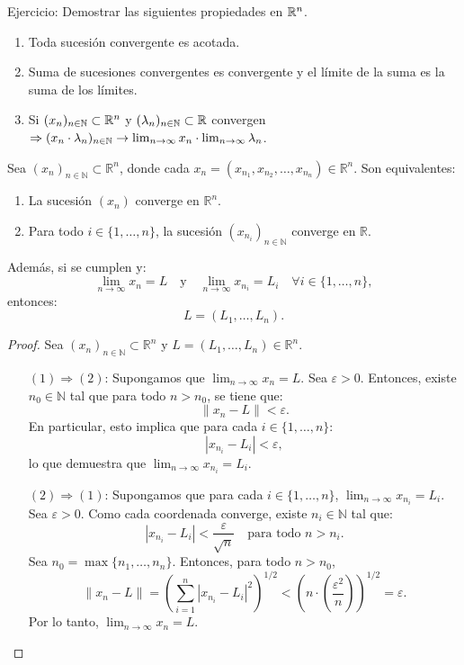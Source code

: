 \begin{prop}
  Ejercicio: Demostrar las siguientes propiedades en $\mathbb{R}^n$.
  \begin{enumerate}
    \item Toda sucesión convergente es acotada.
    \item Suma de sucesiones convergentes es convergente y el límite de la suma es la suma de los límites.
    \item Si $(x_n)_{n \in \mathbb{N}} \subset \mathbb{R}^n$ y $(\lambda_n)_{n \in \mathbb{N}} \subset \mathbb{R}$ convergen $\Rightarrow (x_n \cdot \lambda_n)_{n \in \mathbb{N}} \to \lim_{n \to \infty} x_n \cdot \lim_{n \to \infty} \lambda_n$.
  \end{enumerate}
\end{prop}

\begin{prop}
  Sea $(x_n)_{n \in \mathbb{N}} \subset \mathbb{R}^n$, donde cada $x_n = (x_{n_1}, x_{n_2}, \ldots, x_{n_n}) \in \mathbb{R}^n$. Son equivalentes:
  \begin{enumerate}
    \item La sucesión $(x_n)$ converge en $\mathbb{R}^n$.
    \item Para todo $i \in \{1, \ldots, n\}$, la sucesión $(x_{n_i})_{n \in \mathbb{N}}$ converge en $\mathbb{R}$.
  \end{enumerate}
  Además, si se cumplen y:
  \[
    \lim_{n \to \infty} x_n = L \quad \text{y} \quad \lim_{n \to \infty} x_{n_i} = L_i \quad \forall i \in \{1, \ldots, n\},
  \]
  entonces:
  \[
    L = (L_1, \ldots, L_n).
  \]
  \begin{proof}
    Sea $(x_n)_{n \in \mathbb{N}} \subset \mathbb{R}^n$ y $L = (L_1, \ldots, L_n) \in \mathbb{R}^n$.
    \begin{enumerate}
      \item[$(1) \Rightarrow (2)$:] Supongamos que $\lim_{n \to \infty} x_n = L$. Sea $\varepsilon > 0$. Entonces, existe $n_0 \in \mathbb{N}$ tal que para todo $n > n_0$, se tiene que:
            \[
              \|x_n - L\| < \varepsilon.
            \]
            En particular, esto implica que para cada $i \in \{1, \ldots, n\}$:
            \[
              |x_{n_i} - L_i| < \varepsilon,
            \]
            lo que demuestra que $\lim_{n \to \infty} x_{n_i} = L_i$.

      \item[$(2) \Rightarrow (1)$:] Supongamos que para cada $i \in \{1, \ldots, n\}$, $\lim_{n \to \infty} x_{n_i} = L_i$. Sea $\varepsilon > 0$. Como cada coordenada converge, existe $n_i \in \mathbb{N}$ tal que:
            \[
              |x_{n_i} - L_i| < \frac{\varepsilon}{\sqrt{n}} \quad \text{para todo } n > n_i.
            \]
            Sea $n_0 = \max\{n_1, \ldots, n_n\}$. Entonces, para todo $n > n_0$,
            \[
              \|x_n - L\| = \left( \sum_{i=1}^n |x_{n_i} - L_i|^2 \right)^{1/2} < \left( n \cdot \left( \frac{\varepsilon^2}{n} \right) \right)^{1/2} = \varepsilon.
            \]
            Por lo tanto, $\lim_{n \to \infty} x_n = L$.
    \end{enumerate}
  \end{proof}
\end{prop}

